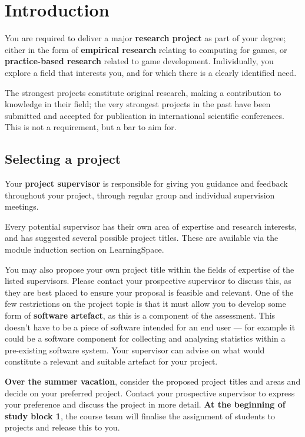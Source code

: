 \chapter{Introduction}

You are required to deliver a major \textbf{research project} as part of your degree;
either in the form of \textbf{empirical research} relating to computing for games,
or \textbf{practice-based research} related to game development.
Individually, you explore a field that interests you, and for which there is a clearly identified need.

The strongest projects constitute original research, making a contribution to knowledge in their field;
the very strongest projects in the past have been submitted and accepted for publication in international
scientific conferences. This is not a requirement, but a bar to aim for.

\section*{Selecting a project}

Your \textbf{project supervisor} is responsible for giving you guidance and feedback throughout your project,
through regular group and individual supervision meetings.

Every potential supervisor has their own area of expertise and research interests,
and has suggested several possible project titles.
These are available via the module induction section on LearningSpace.

You may also propose your own project title within the fields of expertise of the listed supervisors.
Please contact your prospective supervisor to discuss this, as they are best placed to ensure your proposal
is feasible and relevant.
One of the few restrictions on the project topic is that it must allow you to develop some form of \textbf{software artefact},
as this is a component of the assessment.
This doesn't have to be a piece of software intended for an end user ---
for example it could be a software component for collecting and analysing statistics within a pre-existing software system.
Your supervisor can advise on what would constitute a relevant and suitable artefact for your project.

\textbf{Over the summer vacation}, consider the proposed project titles and areas and decide on your preferred project.
Contact your prospective supervisor to express your preference and discuss the project in more detail.
\textbf{At the beginning of study block 1}, the course team will finalise the assignment of students to projects
and release this to you.

